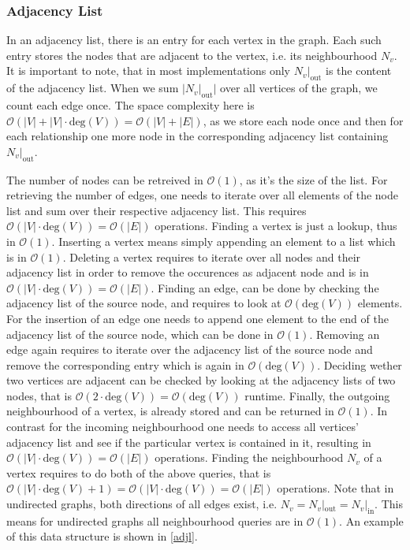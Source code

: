         \subsubsection*{Adjacency List}
        In an adjacency list, there is an entry for each vertex in the graph. 
        Each such entry stores the nodes that are adjacent to the vertex, i.e. its neighbourhood $N_v$. 
        It is important to note, that in most implementations only $N_v |_\text{out}$ is the content of the adjacency list.
        When we sum $|N_v |_\text{out}|$ over all vertices of the graph, we count each edge once.
        The space complexity here is $\mathcal{O}(|V| + |V| \cdot \text{deg}(V)) = \mathcal{O}(|V| + |E|)$, as we store each node once and then for each relationship one more node in the corresponding adjacency list containing $N_v |_\text{out}$.

        The number of nodes can be retreived in $\mathcal{O}(1)$, as it's the size of the list.
        For retrieving the number of edges, one needs to iterate over all elements of the node list and sum over their respective adjacency list. This requires $\mathcal{O}(|V| \cdot \text{deg}(V)) = \mathcal{O}(|E|)$ operations.
        Finding a vertex is just a lookup, thus in $\mathcal{O}(1)$.
        Inserting a vertex means simply appending an element to a list which is in $\mathcal{O}(1)$.
        Deleting a vertex requires to iterate over all nodes and their adjacency list in order to remove the occurences as adjacent node and is in $\mathcal{O}(|V| \cdot \text{deg}(V)) = \mathcal{O}(|E|)$.
        Finding an edge, can be done by checking the adjacency list of the source node, and requires to look at $\mathcal{O}(\text{deg}(V))$ elements.
        For the insertion of an edge one needs to append one element to the end of the adjacency list of the source node, which can be done in $\mathcal{O}(1)$.
        Removing an edge again requires to iterate over the adjacency list of the source node and remove the corresponding entry which is again in $\mathcal{O}(\text{deg}(V))$.        
        Deciding wether two vertices are adjacent can be checked by looking at the adjacency lists of two nodes, that is $\mathcal{O}(2 \cdot \text{deg}(V)) = \mathcal{O}(\text{deg}(V))$ runtime.        
        Finally, the outgoing neighbourhood of a vertex, is already stored and can be returned in $\mathcal{O}(1)$.
        In contrast for the incoming neighbourhood one needs to access all vertices' adjacency list and see if the particular vertex is contained in it, resulting in $\mathcal{O}(|V| \cdot \text{deg}(V)) = \mathcal{O}(|E|)$ operations.
        Finding the neighbourhood $N_v$ of a vertex requires to do both of the above queries, that is $\mathcal{O}(|V| \cdot \text{deg}(V) + 1) = \mathcal{O}(|V| \cdot \text{deg}(V))  = \mathcal{O}(|E|)$ operations.  
        Note that in undirected graphs, both directions of all edges exist, i.e. $N_v = N_v |_\text{out} = N_v |_\text{in}$. This means for undirected graphs all neighbourhood queries are in $\mathcal{O}(1)$.      
        An example of this data structure is shown in \ref{adjl}.
        
